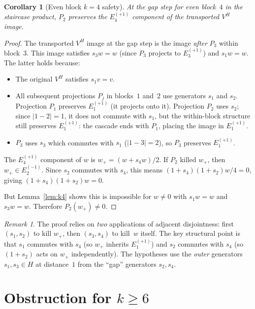 \documentclass[11pt]{article}
\newtheorem{corollary}[theorem]{Corollary}
\theoremstyle{definition}
\theoremstyle{remark}
\newtheorem{remark}[theorem]{Remark}
\begin{document}
\begin{corollary}[Even block $k = 4$ safety]\label{cor:k4-safe}
At the gap step for even block~$4$ in the staircase product, $P_2$
preserves the $E_4^{(+1)}$ component of the transported $V^H$ image.
\end{corollary}

\begin{proof}
The transported $V^H$ image at the gap step is the image \emph{after}
$P_3$ within block~$3$. This image satisfies $s_3 w = w$ (since $P_3$
projects to $E_3^{(+1)}$) and $s_1 w = w$. The latter holds because:
\begin{itemize}
\item The original $V^H$ satisfies $s_1 v = v$.
\item All subsequent projections $P_j$ in blocks~$1$ and~$2$ use
  generators $s_1$ and $s_2$. Projection $P_1$ preserves $E_1^{(+1)}$
  (it projects onto it). Projection $P_2$ uses $s_2$; since
  $|1 - 2| = 1$, it does not commute with $s_1$, but the
  within-block structure still preserves $E_1^{(+1)}$: the cascade
  ends with $P_1$, placing the image in $E_1^{(+1)}$.
\item $P_3$ uses $s_3$ which commutes with $s_1$ ($|1 - 3| = 2$),
  so $P_3$ preserves $E_1^{(+1)}$.
\end{itemize}

The $E_4^{(+1)}$ component of $w$ is $w_+ = (w + s_4 w)/2$.
If $P_2$ killed $w_+$, then $w_+ \in E_2^{(-1)}$. Since $s_2$
commutes with $s_4$, this means $(1 + s_4)(1 + s_2) w / 4 = 0$,
giving $(1 + s_4)(1 + s_2) w = 0$.

But Lemma~\ref{lem:k4} shows this is impossible for $w \ne 0$
with $s_1 w = w$ and $s_3 w = w$. Therefore $P_2(w_+) \ne 0$.
\end{proof}

\begin{remark}
The proof relies on \emph{two} applications of adjacent disjointness:
first $(s_1, s_2)$ to kill $w_+$, then $(s_3, s_4)$ to kill~$w$
itself. The key structural point is that $s_1$ commutes with $s_4$
(so $w_+$ inherits $E_1^{(+1)}$) and $s_2$ commutes with $s_4$
(so $(1+s_2)$ acts on $w_+$ independently). The hypotheses use
the \emph{outer} generators $s_1, s_3 \in H$ at distance~$1$ from
the ``gap'' generators $s_2, s_4$.
\end{remark}


\section{Obstruction for $k \ge 6$}
\end{document}
